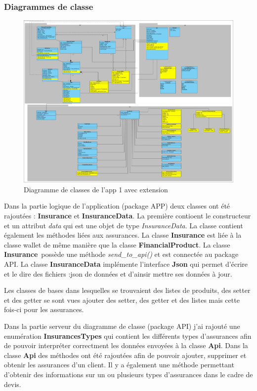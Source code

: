\documentclass[../rapport.tex]{subfiles}
\begin{document}
		\subsubsection{Diagrammes de classe}
				\begin{figure}[h]
						\centering\includegraphics[scale=0.15]{ressources/photos_diagrammes/extensionThomas/classes1Thomas.jpg}
						\caption{Diagramme de classes de l'app 1 avec extension}
				\end{figure}
		Dans la partie logique de l'application (package APP) deux classes ont été rajoutées :
		\textbf{Insurance} et \textbf{InsuranceData}. La première contioent le constructeur et 
		un attribut \textit{data} qui est une objet de type \textit{InsuranceData}. La classe 
		contient également les méthodes liées aux assurances. La classe \textbf{Insurance} est
		liée à la classe wallet de même manière que la classe \textbf{FinancialProduct}. 
		La classe \textbf{Insurance} possède une méthode \textit{send\_to\_api()} et est connectée 
		au package API. La classe \textbf{InsuranceData} implémente l'interface \textbf{Json} qui
		permet d'écrire et le dire des fichiers :json de données et d'ainsir mettre ses données à
		jour.

		\medskip

		Les classes de bases dans lesquelles se trouvaient des listes de produits, des setter et 
		des getter se sont vues ajouter des setter, des getter et des listes mais cette fois-ci
		pour les assurances. 

		\bigskip

		Dans la partie serveur du diagramme de classe (package API) j'ai rajouté une enumération
		\textbf{InsurancesTypes} qui contient les différents types d'assurances afin de pouvoir
		interpréter correctment les données envoyées à la classe \textbf{Api}. Dans la classe
		\textbf{Api} des méthodes ont été rajoutées afin de pouvoir ajouter, supprimer et obtenir
		les assurances d'un client. Il y a également une méthode permettant d'obtenir des 
		informations sur un ou plusieurs types d'assurances dans le cadre de devis.
\end{document}
